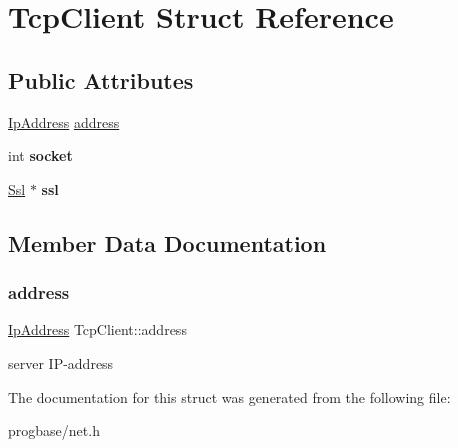 \hypertarget{struct_tcp_client}{}\section{Tcp\+Client Struct Reference}
\label{struct_tcp_client}
\subsection*{Public Attributes}
\begin{DoxyCompactItemize}
\item 
\hyperlink{struct_ip_address}{Ip\+Address} \hyperlink{struct_tcp_client_a09414ff617516c01b924242402576a02}{address}
\item 
\mbox{\label{struct_tcp_client_a65f3c371110f630616b3b459972753b1}} 
int {\bfseries socket}
\item 
\mbox{\label{struct_tcp_client_acf4cd7b181aa01d3fbf2bbda25c7f4a7}} 
\hyperlink{struct_ssl}{Ssl} $\ast$ {\bfseries ssl}
\end{DoxyCompactItemize}


\subsection{Member Data Documentation}
\mbox{\label{struct_tcp_client_a09414ff617516c01b924242402576a02}} 
\subsubsection{\texorpdfstring{address}{address}}
{\footnotesize\ttfamily \hyperlink{struct_ip_address}{Ip\+Address} Tcp\+Client\+::address}

server I\+P-\/address 

The documentation for this struct was generated from the following file\+:\begin{DoxyCompactItemize}
\item 
progbase/net.\+h\end{DoxyCompactItemize}
